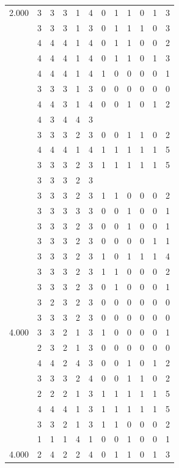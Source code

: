 \documentclass[]{msu-thesis}
\theoremstyle{definition}
\theoremstyle{definition}
\theoremstyle{definition}
\theoremstyle{remark}
\begin{document}
\begin{table}
{\begin{tabular}[t]{rrrrrrrrrrrr}
2.000 & 3 & 3 & 3 & 1 & 4 & 0 & 1 & 1 & 0 & 1 & 3\\
 & 3 & 3 & 3 & 1 & 3 & 0 & 1 & 1 & 1 & 0 & 3\\
 & 4 & 4 & 4 & 1 & 4 & 0 & 1 & 1 & 0 & 0 & 2\\
 & 4 & 4 & 4 & 1 & 4 & 0 & 1 & 1 & 0 & 1 & 3\\
 & 4 & 4 & 4 & 1 & 4 & 1 & 0 & 0 & 0 & 0 & 1\\
 & 3 & 3 & 3 & 1 & 3 & 0 & 0 & 0 & 0 & 0 & 0\\
 & 4 & 4 & 3 & 1 & 4 & 0 & 0 & 1 & 0 & 1 & 2\\
 & 4 & 3 & 4 & 4 & 3 &  &  &  &  &  & \\
 & 3 & 3 & 3 & 2 & 3 & 0 & 0 & 1 & 1 & 0 & 2\\
 & 4 & 4 & 4 & 1 & 4 & 1 & 1 & 1 & 1 & 1 & 5\\
 & 3 & 3 & 3 & 2 & 3 & 1 & 1 & 1 & 1 & 1 & 5\\
 & 3 & 3 & 3 & 2 & 3 &  &  &  &  &  & \\
 & 3 & 3 & 3 & 2 & 3 & 1 & 1 & 0 & 0 & 0 & 2\\
 & 3 & 3 & 3 & 3 & 3 & 0 & 0 & 1 & 0 & 0 & 1\\
 & 3 & 3 & 3 & 2 & 3 & 0 & 0 & 1 & 0 & 0 & 1\\
 & 3 & 3 & 3 & 2 & 3 & 0 & 0 & 0 & 0 & 1 & 1\\
 & 3 & 3 & 3 & 2 & 3 & 1 & 0 & 1 & 1 & 1 & 4\\
 & 3 & 3 & 3 & 2 & 3 & 1 & 1 & 0 & 0 & 0 & 2\\
 & 3 & 3 & 3 & 2 & 3 & 0 & 1 & 0 & 0 & 0 & 1\\
 & 3 & 2 & 3 & 2 & 3 & 0 & 0 & 0 & 0 & 0 & 0\\
 & 3 & 3 & 3 & 2 & 3 & 0 & 0 & 0 & 0 & 0 & 0\\
4.000 & 3 & 3 & 2 & 1 & 3 & 1 & 0 & 0 & 0 & 0 & 1\\
 & 2 & 3 & 2 & 1 & 3 & 0 & 0 & 0 & 0 & 0 & 0\\
 & 4 & 4 & 2 & 4 & 3 & 0 & 0 & 1 & 0 & 1 & 2\\
 & 3 & 3 & 3 & 2 & 4 & 0 & 0 & 1 & 1 & 0 & 2\\
 & 2 & 2 & 2 & 1 & 3 & 1 & 1 & 1 & 1 & 1 & 5\\
 & 4 & 4 & 4 & 1 & 3 & 1 & 1 & 1 & 1 & 1 & 5\\
 & 3 & 3 & 2 & 1 & 3 & 1 & 1 & 0 & 0 & 0 & 2\\
 & 1 & 1 & 1 & 4 & 1 & 0 & 0 & 1 & 0 & 0 & 1\\
4.000 & 2 & 4 & 2 & 2 & 4 & 0 & 1 & 1 & 0 & 1 & 3\\

\end{tabular}}
\end{table}
\end{document}
